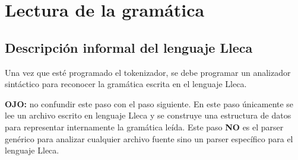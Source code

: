 \documentclass{article}
\newcommand{\lleca}{\textsf{Lleca}\xspace}
\begin{document}
\section{Lectura de la gram\'atica}

\subsection{Descripci\'on informal del lenguaje \lleca}

Una vez que est\'e programado el tokenizador, se debe programar un
analizador sint\'actico para reconocer la gram\'atica
escrita en el lenguaje \lleca.

{\bf OJO:} no confundir este paso con el paso siguiente.
En este paso \'unicamente se lee un archivo escrito en lenguaje
\lleca y se construye una estructura de datos para representar
internamente la gram\'atica le\'ida.
Este paso {\bf NO} es el parser gen\'erico para analizar cualquier
archivo fuente sino un parser espec\'ifico para el lenguaje \lleca.
\end{document}
